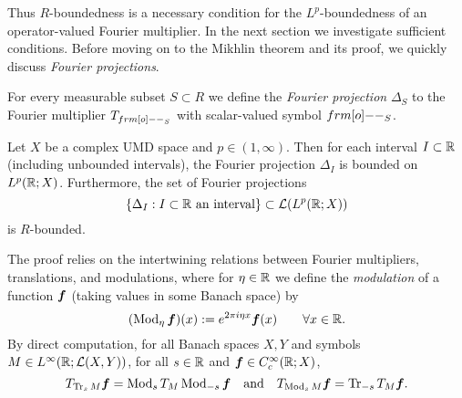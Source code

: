 Thus $R$-boundedness is a necessary condition for the $L^p$-boundedness of an operator-valued Fourier multiplier.
In the next section we investigate sufficient conditions.
Before moving on to the Mikhlin theorem and its proof, we quickly discuss \emph{Fourier projections}.

\begin{defn}
  For every measurable subset $S \subset R$ we define the \emph{Fourier projection} $\Delta_{S}$ to the Fourier multiplier $T_{\1_{S}}$ with scalar-valued symbol $\1_{S}$.
\end{defn}

\begin{prop}\label{prop:Fproj-Rbd}
  Let $X$ be a complex UMD space and $p \in (1,\infty)$.
  Then for each interval $I \subset \mathbb{R}$ (including unbounded intervals), the Fourier projection $\Delta_{I}$ is bounded on $L^p(\mathbb{R};X)$.
  Furthermore, the set of Fourier projections
  \begin{equation*}
    \{\Delta_{I} : \text{$I \subset \mathbb{R}$ an interval} \} \subset \mathcal{L}(L^p(\mathbb{R};X))
  \end{equation*}
  is $R$-bounded.
\end{prop}

The proof relies on the intertwining relations between Fourier multipliers, translations, and modulations, where for $\eta \in \mathbb{R}$ we define the \emph{modulation} of a function $\bm{f}$ (taking values in some Banach space) by
\begin{equation*}
  (\operatorname{Mod}_{\eta} \bm{f})(x) := e^{2\pi i \eta x} \bm{f}(x) \qquad \forall x \in \mathbb{R}.
\end{equation*}
By direct computation, for all Banach spaces $X,Y$ and symbols $M \in L^\infty(\mathbb{R};\mathcal{L}(X,Y))$, for all $s \in \mathbb{R}$ and $\bm{f} \in C^{\infty}_{c}(\mathbb{R};X)$,
\begin{equation*}
  T_{\operatorname{Tr}_{s} M} \bm{f} = \operatorname{Mod}_{s} T_{M} \operatorname{Mod}_{-s} \bm{f} \quad \text{and} \quad
  T_{\operatorname{Mod}_{s} M} \bm{f} = \operatorname{Tr}_{-s} T_{M} \bm{f}. 
\end{equation*}

